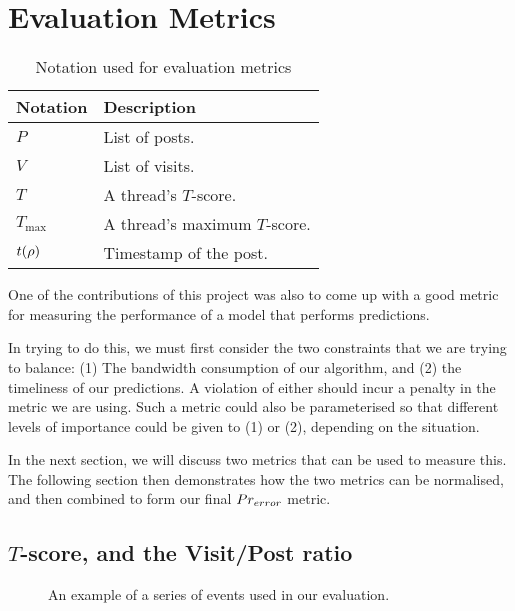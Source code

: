 \renewcommand{\P}{Pr}
\chapter{Evaluation Metrics}


\begin{table}
\begin{center}
\begin{tabular}{l l}
	\hline
Notation	&	Description		\\
	\hline
$P$			&	List of posts. \\
$V$			&	List of visits.\\
$T$			&	A thread's $T$-score. \\
	$T_\text{max}$	&	A thread's maximum $T$-score. \\
$t(\rho)$	&	Timestamp of the post.\\
	\hline
\end{tabular}
\end{center}
	\caption{Notation used for evaluation metrics}
\end{table}


One of the contributions of this project was also to come up with a good metric 
for measuring the performance of a model that performs predictions. 

In trying to do this, we must first consider the two constraints that we are 
trying to balance: (1) The bandwidth consumption of our algorithm, and (2) the 
timeliness of our predictions. A violation of either should incur a penalty in 
the metric we are using. Such a metric could also be parameterised so that 
different levels of importance could be given to (1) or (2), depending on the 
situation.

In the next section, we will discuss two metrics that can be used to measure 
this. The following section then demonstrates how the two metrics can be 
normalised, and then combined to form our final $Pr_{error}$ metric.

\section{$T$-score, and the Visit/Post ratio}

\begin{figure}
	\begin{center}
	
	\caption{An example of a series of events used in our evaluation.}
	\end{center}
\end{figure}


